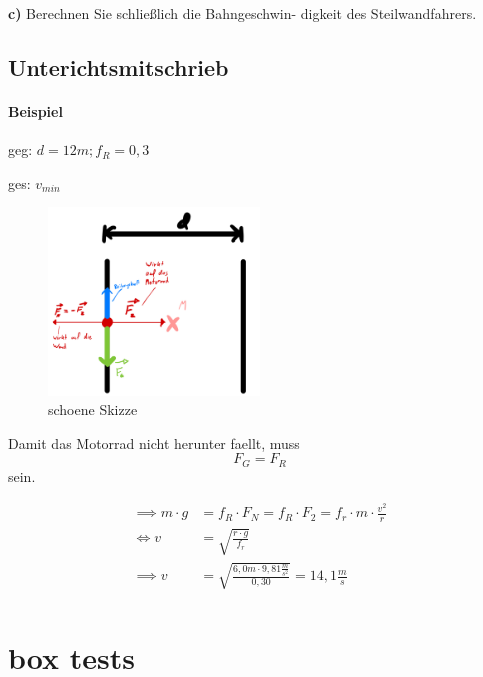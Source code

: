\documentclass{report}
\begin{document}
\textbf{c)} Berechnen Sie schließlich die Bahngeschwin-
digkeit des Steilwandfahrers.

\clearpage
\subsection{Unterichtsmitschrieb}
\paragraph{Beispiel}

geg: $d=12m; f_R = 0,3$

ges: $v_{min}$

\begin{figure}[htpb]
  \begin{center}
    \includegraphics[width=0.5\textwidth]{./physic-figures/motorrad-kraft.jpg}
  \end{center}
  \caption{schoene Skizze}
\end{figure}

Damit das Motorrad nicht herunter faellt, muss \[F_G = F_R\] sein.

\begin{align*}
  \implies m\cdot g&=f_R \cdot F_N = f_R\cdot F_2 = f_r\cdot m \cdot \frac{v^2}{r}\\
  \Leftrightarrow v &= \sqrt{\frac{r\cdot g}{f_r}}\\
  \implies v &=\sqrt{\frac{6,0m\cdot 9,81 \frac{m}{s^2}}{0,30}} = 14,1 \frac{m}{s}\\
\end{align*}





\clearpage
\section{box tests}
\end{document}
